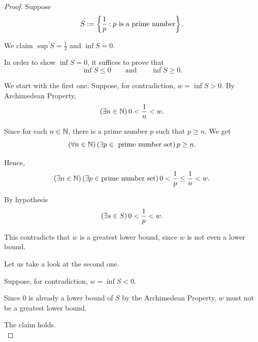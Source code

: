 \subsubsection{}
\begin{proof}
    Suppose 
    \begin{equation*}
        S := \left\{\frac{1}{p} : p \text{ is a prime number}\right\}. 
    \end{equation*}

    We claim $\sup S = \frac{1}{2}$ and $\inf S = 0$. 

    In order to show $\inf S = 0$, it suffices to prove that 
    \begin{equation*}
        \inf S \leq 0 \qquad \text{and} \qquad \inf S \geq 0. 
    \end{equation*}

    We start with the first one. Suppose, for contradiction, $w = \inf S > 0$. By Archimedean Property, 
    \begin{equation*}
        \left(\exists n \in \mathbb{N} \right)0 < \frac{1}{n} < w. 
    \end{equation*}

    Since for each $n \in \mathbb{N}$, there is a prime number $p$ such that $p \geq n$. We get 
    \begin{equation*}
        \left(\forall n \in \mathbb{N}\right)\left(\exists p \in \text{ prime number set}\right) p \geq n. 
    \end{equation*}

    Hence, 
    \begin{equation*}
        \left(\exists n \in \mathbb{N} \right)\left(\exists p \in \text{prime number set}\right)0 < \frac{1}{p} \leq \frac{1}{n} < w. 
    \end{equation*}

    By hypothesis 
    \begin{equation*}
        \left(\exists s \in S\right) 0 < \frac{1}{p} < w. 
    \end{equation*}

    This contradicts that $w$ is a greatest lower bound, since $w$ is not even a lower bound. 

    Let us take a look at the second one. 

    Suppose, for contradiction,  $w = \inf S < 0$. 

   Since $0$ is already a lower bound of $S$ by the Archimedean Property, $w$ must not be a greatest lower bound. 

   The claim holds. \\


\end{proof}
